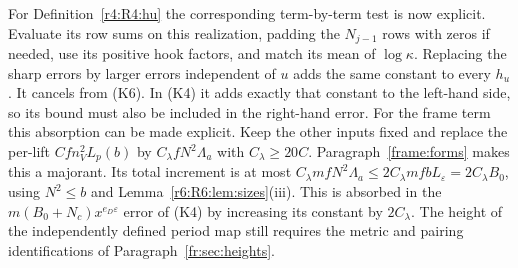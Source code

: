 For Definition~\ref{r4:R4:hu} the corresponding term-by-term test is
now explicit. Evaluate its row sums on this realization, padding the
$N_{j-1}$ rows with zeros if needed, use its positive hook factors,
and match its mean of $\log\kappa$. Replacing the sharp errors by
larger errors independent of $u$ adds the same constant to every
$h_u$. It cancels from (K6). In (K4) it adds exactly that constant
to the left-hand side, so its bound must also be included in the
right-hand error. For the frame term this absorption can be made
explicit. Keep the other inputs fixed and replace the per-lift
$Cfn_V^2L_p(b)$ by $C_\lambda fN^2\Lambda_a$ with
$C_\lambda\ge20C$. Paragraph~\ref{frame:forms} makes this a
majorant. Its total increment is at most
$C_\lambda mfN^2\Lambda_a\le 2C_\lambda mfbL_\varepsilon
=2C_\lambda B_0$, using $N^2\le b$ and
Lemma~\ref{r6:R6:lem:sizes}(iii). This is absorbed in the
$m(B_0+N_c)x^{e_D\varepsilon}$ error of (K4) by increasing its
constant by $2C_\lambda$. The height of the independently defined period map
still requires the metric and pairing identifications of
Paragraph~\ref{fr:sec:heights}.
